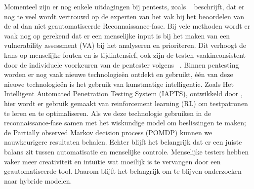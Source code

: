 Momenteel zijn er nog enkele uitdagingen bij pentests, zoals ~\textcite{Fugkeaw} beschrijft, dat er nog te veel wordt vertrouwd 
op de experten van het vak bij het beoordelen van de al dan niet geautomatiseerde Reconnaissance-fase. Bij vele methoden wordt er vaak nog op gerekend dat er een menselijke input is bij het maken van een vulnerability assessment (VA) bij het analyseren en prioriteren. Dit verhoogt de kans op menselijke fouten en is tijdintensief, ook zijn de testen vaakinconsistent door de individuele voorkeuren van de pentester volgens ~\textcite{Ghanem}.
Binnen pentesting worden er nog vaak nieuwe technologieën ontdekt en gebruikt, één van deze nieuwe technologieën is het gebruik van kunstmatige intelligentie. Zoals Het Intelligent Automated Penetration Testing System (IAPTS), ontwikkeld door \textcite{Ghanem}, hier wordt er gebruik gemaakt van reinforcement learning (RL) om testpatronen te leren en te optimaliseren. Als we deze technologie gebruiken in de reconnaissance-fase samen met het wiskundige model om beslissingen te maken; de Partially observed Markov decision process (POMDP) kunnen we nauwkeurigere resultaten behalen. Echter blijft het belangrijk dat er een juiste balans zit tussen automatisatie en menselijke controle. Menselijke testers hebben vaker meer creativiteit en intuïtie wat moeilijk is te vervangen door een geautomatiseerde tool. Daarom blijft het belangrijk om te blijven onderzoeken naar hybride modelen.








